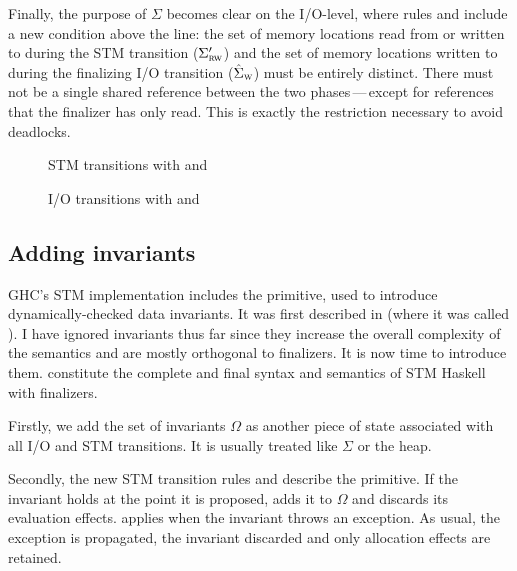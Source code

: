Finally, the purpose of $\Sigma$ becomes clear on the I/O-level, where rules  and  include a new condition above the line:
the set of memory locations read from or written to during the STM transition ($\Sigma'_\textsc{rw}$) and the set of memory locations written to during the finalizing I/O transition ($\hat{\Sigma}_\textsc{w}$) must be entirely distinct.
There must not be a single shared reference between the two phases\,---\,except for references that the finalizer has only read.
This is exactly the restriction necessary to avoid deadlocks.

\begin{figure}[p]

\caption{STM transitions with  and }
\label{fig:step2-stm}
\end{figure}

\begin{figure}[p]

\caption{I/O transitions with  and }
\label{fig:step2-io}
\end{figure}

\clearpage


\subsection{Adding invariants}

GHC's STM implementation includes the  primitive, used to introduce dynamically-checked data invariants.
It was first described in \textcite{harris-peytonjones-2006} (where it was called ).
I have ignored invariants thus far since they increase the overall complexity of the semantics and are mostly orthogonal to finalizers.
It is now time to introduce them.
 constitute the complete and final syntax and semantics of STM Haskell with finalizers.

Firstly, we add the set of invariants $\Omega$ as another piece of state associated with all I/O and STM transitions.
It is usually treated like $\Sigma$ or the heap.

Secondly, the new STM transition rules  and  describe the  primitive.
If the invariant holds at the point it is proposed,  adds it to $\Omega$ and discards its evaluation effects.
 applies when the invariant throws an exception.
As usual, the exception is propagated, the invariant discarded and only allocation effects are retained.

